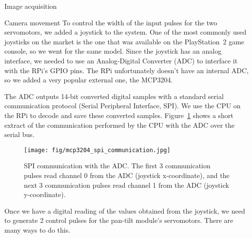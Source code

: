 \documentclass[10pt]{article}
\begin{document}
\begin{section}{Image acquisition}
\begin{subsubsection}{Camera movement}
        To control the width of the input pulses for the two servomotors, we added a joystick to the system. One of the most commonly used joysticks on the market is the one that was available on the PlayStation~2 game console, so we went for the same model. Since the joystick has an {analog} interface, we needed to use an Analog-Digital Converter (ADC) to interface it with the RPi's GPIO pins. The RPi unfortunately doesn't have an internal ADC, so we added a very popular external one, the MCP3204.

        \medskip

        The ADC outputs 14-bit converted digital samples with a standard serial communication protocol (Serial Peripheral Interface, SPI). We use the CPU on the RPi to decode and save these converted samples. Figure~\ref{fig:adc_spi_communication} shows a short extract of the communication performed by the CPU with the ADC over the serial bus.

        \begin{figure}[!h]
            \begin{center}
                \texttt{[image: fig/mcp3204\_spi\_communication.jpg]}
                \caption{SPI communication with the ADC. The first 3 communication pulses read channel 0 from the ADC (joystick x-coordinate), and the next 3 communication pulses read channel 1 from the ADC (joystick y-coordinate).}
                \label{fig:adc_spi_communication}
            \end{center}
        \end{figure}

        \newpage

        Once we have a digital reading of the values obtained from the joystick, we need to generate 2 control pulses for the pan-tilt module's servomotors. There are many ways to do this.


\end{subsubsection}
\end{section}
\end{document}
